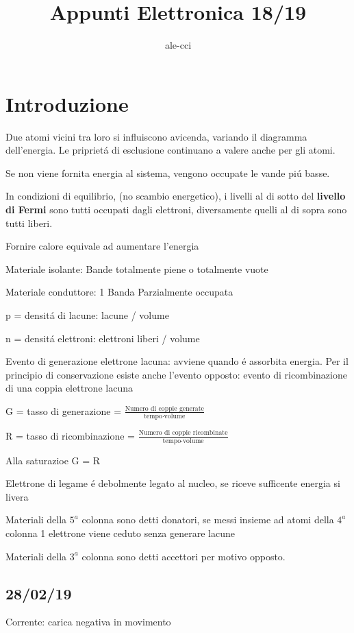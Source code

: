 \documentclass{article}
\author{ale-cci}
\title{Appunti Elettronica 18/19}
\begin{document}
\maketitle{}
\tableofcontents{}
\newpage

\section{Introduzione}
Due atomi vicini tra loro si influiscono avicenda, variando il diagramma dell'energia.
Le pripriet\'a di esclusione continuano a valere anche per gli atomi.

Se non viene fornita energia al sistema, vengono occupate le vande pi\'u basse.

In condizioni di equilibrio, (no scambio energetico), i livelli al di sotto del \textbf{livello di Fermi} sono tutti occupati dagli elettroni, diversamente quelli al di sopra sono tutti liberi.

Fornire calore equivale ad aumentare l'energia

Materiale isolante: Bande totalmente piene o totalmente vuote

Materiale conduttore: 1 Banda Parzialmente occupata

p = densit\'a di lacune: lacune / volume

n = densit\'a elettroni: elettroni liberi / volume


Evento di generazione elettrone lacuna: avviene quando \'e assorbita energia. Per il principio di conservazione esiste anche l'evento opposto: evento di ricombinazione di una coppia elettrone lacuna


G = tasso di generazione = $\frac{\text{Numero di coppie generate}}{\text{tempo}\cdot\text{volume}}$

R = tasso di ricombinazione = $\frac{\text{Numero di coppie ricombinate}}{\text{tempo}\cdot\text{volume}}$

Alla saturazioe G = R


Elettrone di legame \'e debolmente legato al nucleo, se riceve sufficente energia si livera

Materiali della $5^a$ colonna sono detti donatori, se messi insieme ad atomi della $4^a$ colonna 1 elettrone viene ceduto senza generare lacune

Materiali della $3^a$ colonna sono detti accettori per motivo opposto.

\subsection{28/02/19}
Corrente: carica negativa in movimento
\end{document}
